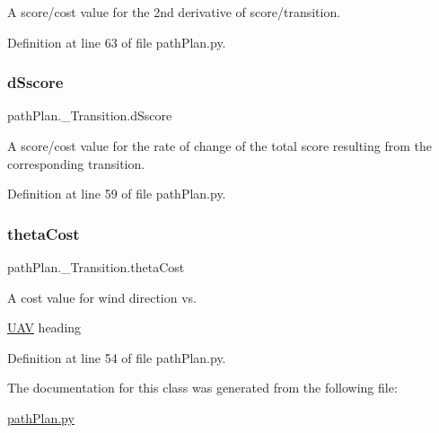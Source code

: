 A score/cost value for the 2nd derivative of score/transition. 



Definition at line 63 of file path\+Plan.\+py.

\mbox{\label{classpath_plan_1_1___transition_afa609d3874eb34ae2aa3efa67d762896}} 
\subsubsection{\texorpdfstring{d\+Sscore}{dSscore}}
{\footnotesize\ttfamily path\+Plan.\+\_\+\+Transition.\+d\+Sscore}



A score/cost value for the rate of change of the total score resulting from the corresponding transition. 



Definition at line 59 of file path\+Plan.\+py.

\mbox{\label{classpath_plan_1_1___transition_a405e375ebe2b2a5d66b50721c338c6e8}} 
\subsubsection{\texorpdfstring{theta\+Cost}{thetaCost}}
{\footnotesize\ttfamily path\+Plan.\+\_\+\+Transition.\+theta\+Cost}



A cost value for wind direction vs. 

\mbox{\hyperlink{classpath_plan_1_1_u_a_v}{U\+AV}} heading 

Definition at line 54 of file path\+Plan.\+py.



The documentation for this class was generated from the following file\+:\begin{DoxyCompactItemize}
\item 
\mbox{\hyperlink{path_plan_8py}{path\+Plan.\+py}}\end{DoxyCompactItemize}

